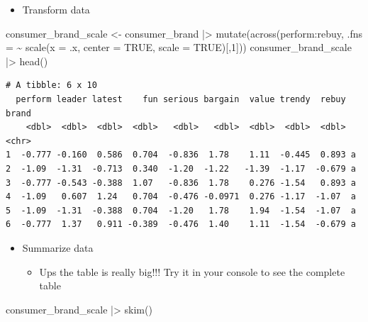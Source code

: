 \documentclass[
  ignorenonframetext,
]{beamer}
\newenvironment{Shaded}{\begin{snugshade}}{\end{snugshade}}
\newcommand{\AttributeTok}[1]{\textcolor[rgb]{0.40,0.45,0.13}{#1}}
\newcommand{\ConstantTok}[1]{\textcolor[rgb]{0.56,0.35,0.01}{#1}}
\newcommand{\DecValTok}[1]{\textcolor[rgb]{0.68,0.00,0.00}{#1}}
\newcommand{\FunctionTok}[1]{\textcolor[rgb]{0.28,0.35,0.67}{#1}}
\newcommand{\NormalTok}[1]{\textcolor[rgb]{0.00,0.23,0.31}{#1}}
\newcommand{\OtherTok}[1]{\textcolor[rgb]{0.00,0.23,0.31}{#1}}
\newcommand{\SpecialCharTok}[1]{\textcolor[rgb]{0.37,0.37,0.37}{#1}}
\providecommand{\tightlist}{%
  \setlength{\itemsep}{0pt}\setlength{\parskip}{0pt}}\usepackage{longtable,booktabs,array}
\begin{document}
\begin{frame}[fragile]{}
\label{section-4}
\begin{itemize}
\tightlist
\item
  Transform data
\end{itemize}

\tiny

\begin{Shaded}
\begin{Highlighting}[]
\NormalTok{consumer\_brand\_scale }\OtherTok{\textless{}{-}}\NormalTok{ consumer\_brand }\SpecialCharTok{|\textgreater{}} 
  \FunctionTok{mutate}\NormalTok{(}\FunctionTok{across}\NormalTok{(perform}\SpecialCharTok{:}\NormalTok{rebuy, }
                \AttributeTok{.fns =} \SpecialCharTok{\textasciitilde{}} \FunctionTok{scale}\NormalTok{(}\AttributeTok{x =}\NormalTok{ .x,}
                               \AttributeTok{center =} \ConstantTok{TRUE}\NormalTok{,}
                               \AttributeTok{scale =} \ConstantTok{TRUE}\NormalTok{)[,}\DecValTok{1}\NormalTok{]))}
\NormalTok{consumer\_brand\_scale }\SpecialCharTok{|\textgreater{}} \FunctionTok{head}\NormalTok{()}
\end{Highlighting}
\end{Shaded}

\begin{verbatim}
# A tibble: 6 x 10
  perform leader latest    fun serious bargain  value trendy  rebuy brand
    <dbl>  <dbl>  <dbl>  <dbl>   <dbl>   <dbl>  <dbl>  <dbl>  <dbl> <chr>
1  -0.777 -0.160  0.586  0.704  -0.836  1.78    1.11  -0.445  0.893 a    
2  -1.09  -1.31  -0.713  0.340  -1.20  -1.22   -1.39  -1.17  -0.679 a    
3  -0.777 -0.543 -0.388  1.07   -0.836  1.78    0.276 -1.54   0.893 a    
4  -1.09   0.607  1.24   0.704  -0.476 -0.0971  0.276 -1.17  -1.07  a    
5  -1.09  -1.31  -0.388  0.704  -1.20   1.78    1.94  -1.54  -1.07  a    
6  -0.777  1.37   0.911 -0.389  -0.476  1.40    1.11  -1.54  -0.679 a    
\end{verbatim}
\end{frame}

\begin{frame}[fragile]{}
\label{section-5}
\begin{itemize}
\item
  Summarize data

  \begin{itemize}
  \tightlist
  \item
    Ups the table is really big!!! Try it in your console to see the
    complete table
  \end{itemize}
\end{itemize}

\tiny

\begin{Shaded}
\begin{Highlighting}[]
\NormalTok{consumer\_brand\_scale }\SpecialCharTok{|\textgreater{}} \FunctionTok{skim}\NormalTok{()}
\end{Highlighting}
\end{Shaded}
\end{frame}
\end{document}
